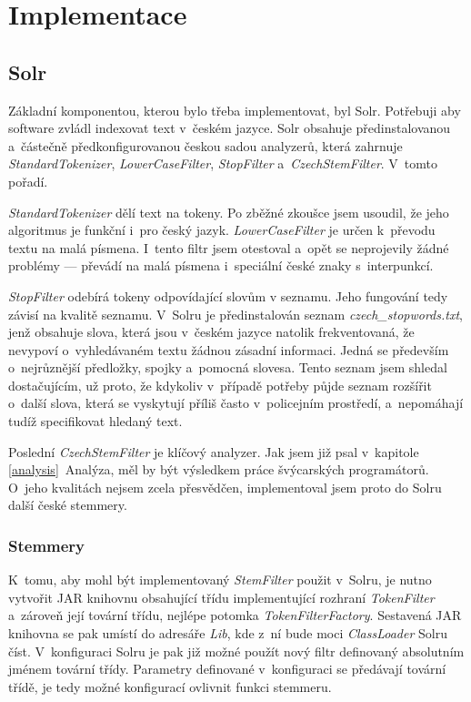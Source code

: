\chapter{Implementace}
\section{Solr}
Základní komponentou, kterou bylo třeba implementovat, byl Solr. Potřebuji aby software zvládl indexovat text v~českém jazyce. Solr obsahuje předinstalovanou a~částečně předkonfigurovanou českou sadou analyzerů, která zahrnuje \emph{StandardTokenizer}, \emph{LowerCaseFilter}, \emph{StopFilter} a~\emph{CzechStemFilter}. V~tomto pořadí.

\emph{StandardTokenizer} dělí text na tokeny. Po zběžné zkoušce jsem usoudil, že jeho algoritmus je funkční i~pro český jazyk. \emph{LowerCaseFilter} je určen k~převodu textu na malá písmena. I~tento filtr jsem otestoval a~opět se neprojevily žádné problémy --- převádí na malá písmena i~speciální české znaky s~interpunkcí. 

\emph{StopFilter} odebírá tokeny odpovídající slovům v seznamu. Jeho fungování tedy závisí na kvalitě seznamu. V~Solru je předinstalován seznam \emph{czech\_stopwords.txt}, jenž obsahuje slova, která jsou v~českém jazyce natolik frekventovaná, že nevypoví o~vyhledávaném textu žádnou zásadní informaci. Jedná se především o~nejrůznější předložky, spojky a~pomocná slovesa. Tento seznam jsem shledal dostačujícím, už proto, že kdykoliv v~případě potřeby půjde seznam rozšířit o~další slova, která se vyskytují příliš často v~policejním prostředí, a~nepomáhají tudíž specifikovat hledaný text.

Poslední \emph{CzechStemFilter} je klíčový analyzer. Jak jsem již psal v~kapitole \ref{analysis}~Analýza, měl by být výsledkem práce švýcarských programátorů. O~jeho kvalitách nejsem zcela přesvědčen, implementoval jsem proto do Solru další české stemmery.

\subsection{Stemmery}
K~tomu, aby mohl být implementovaný \emph{StemFilter} použit v~Solru, je nutno vytvořit JAR knihovnu obsahující třídu implementující rozhraní \emph{TokenFilter} a~zároveň její tovární třídu, nejlépe potomka \emph{TokenFilterFactory}. Sestavená JAR knihovna se pak umístí do adresáře \emph{Lib}, kde z~ní bude moci \emph{ClassLoader} Solru číst. V~konfiguraci Solru je pak již možné použít nový filtr definovaný absolutním jménem tovární třídy. Parametry definované v~konfiguraci se předávají tovární třídě, je tedy možné konfigurací ovlivnit funkci stemmeru.

